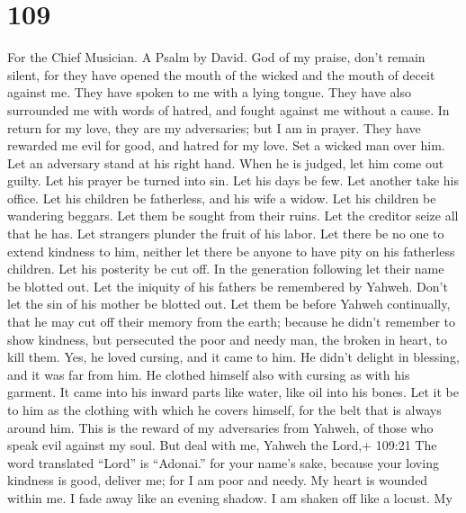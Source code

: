 \hypertarget{section-99}{%
\section{109}\label{section-99}}

For the Chief Musician. A Psalm by David.  God of my praise,
don't remain silent,  for they have opened the mouth of the
wicked and the mouth of deceit against me. They have spoken to me with a
lying tongue.  They have also surrounded me with words of
hatred, and fought against me without a cause.  In return
for my love, they are my adversaries; but I am in prayer. 
They have rewarded me evil for good, and hatred for my love.
 Set a wicked man over him. Let an adversary stand at his
right hand.  When he is judged, let him come out guilty. Let
his prayer be turned into sin.  Let his days be few. Let
another take his office.  Let his children be fatherless,
and his wife a widow.  Let his children be wandering
beggars. Let them be sought from their ruins.  Let the
creditor seize all that he has. Let strangers plunder the fruit of his
labor.  Let there be no one to extend kindness to him,
neither let there be anyone to have pity on his fatherless children.
 Let his posterity be cut off. In the generation following
let their name be blotted out.  Let the iniquity of his
fathers be remembered by Yahweh. Don't let the sin of his mother be
blotted out.  Let them be before Yahweh continually, that
he may cut off their memory from the earth;  because he
didn't remember to show kindness, but persecuted the poor and needy man,
the broken in heart, to kill them.  Yes, he loved cursing,
and it came to him. He didn't delight in blessing, and it was far from
him.  He clothed himself also with cursing as with his
garment. It came into his inward parts like water, like oil into his
bones.  Let it be to him as the clothing with which he
covers himself, for the belt that is always around him. 
This is the reward of my adversaries from Yahweh, of those who speak
evil against my soul.  But deal with me, Yahweh the Lord,+
109:21 The word translated ``Lord'' is ``Adonai.'' for your name's sake,
because your loving kindness is good, deliver me;  for I am
poor and needy. My heart is wounded within me.  I fade away
like an evening shadow. I am shaken off like a locust.  My
